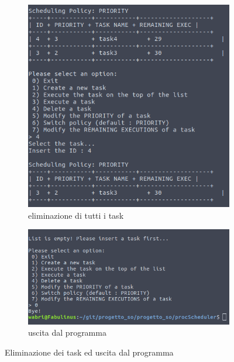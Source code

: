 \begin{figure}
\centering
\begin{subfigure}[b]{0.4\textwidth}
\includegraphics[width=\textwidth]{progetto_so/procScheduler/screenshot/9_deletion_of_a_task}
\caption{eliminazione di tutti i task}
\end{subfigure}
\begin{subfigure}[b]{0.4\textwidth}
\includegraphics[width=\textwidth]{progetto_so/procScheduler/screenshot/11_exit}
\caption{uscita dal programma}
\end{subfigure}
\caption{Eliminazione dei task ed uscita dal programma}
\end{figure}

